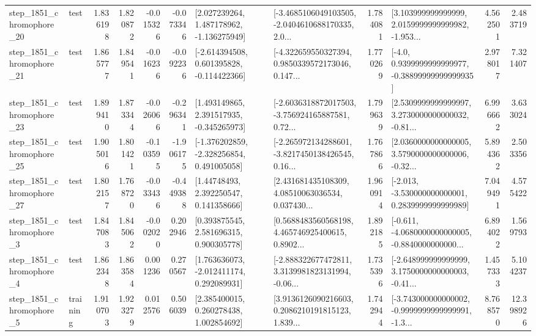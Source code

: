 \begin{tabular}{llrrrrllrlrr}
 step\_1851\_chromophore\_20 &      test &      1.836198 &    1.820872 &     -0.015326 & -0.073346 &    [2.027239264, 1.487178962, -1.136275949] &  [-3.4685106049103505, -2.0404610688170335, 2.0... &       1.784081 &  [3.103999999999999, 2.0159999999999982, -1.953... &            4.562501 &          2.483719 \\
 step\_1851\_chromophore\_21 &      test &      1.865777 &    1.849541 &     -0.016236 & -0.092236 &   [-2.614394508, 0.601395828, -0.114422366] &  [-4.322659550327394, 0.9850339572173046, 0.147... &       1.770269 &   [-4.0, 0.9399999999999977, -0.38899999999999935] &            2.978017 &          7.321407 \\
 step\_1851\_chromophore\_23 &      test &      1.899410 &    1.873344 &     -0.026066 & -0.296341 &    [1.493149865, 2.391517935, -0.345265973] &  [-2.6036318872017503, -3.756924165887581, 0.72... &       1.799639 &  [2.5309999999999997, 3.2730000000000032, -0.81... &            6.996662 &          3.633024 \\
 step\_1851\_chromophore\_25 &      test &      1.905016 &    1.801421 &     -0.103595 & -1.906175 &   [-1.376202859, -2.328256854, 0.491005058] &  [-2.265972134288601, -3.8217450138426545, 0.16... &       1.767866 &  [2.0360000000000005, 3.5790000000000006, -0.32... &            5.894362 &          2.503356 \\
 step\_1851\_chromophore\_27 &      test &      1.802157 &    1.768720 &     -0.033436 & -0.449388 &      [1.44748493, 2.392250547, 0.141358666] &  [2.431681435108309, 4.08510063036534, 0.037430... &       1.960914 &   [-2.013, -3.530000000000001, 0.2839999999999989] &            7.049491 &          4.575422 \\
  step\_1851\_chromophore\_3 &      test &      1.847083 &    1.845062 &     -0.002020 &  0.202946 &     [0.393875545, 2.581696315, 0.900305778] &  [0.5688483560568198, 4.465746925400615, 0.8902... &       1.892185 &  [-0.611, -4.0680000000000005, -0.8840000000000... &            6.894022 &          1.569793 \\
  step\_1851\_chromophore\_4 &      test &      1.862348 &    1.863584 &      0.001236 &  0.270567 &    [1.763636073, -2.012411174, 0.292089931] &  [-2.888322677472811, 3.3139981823131994, -0.06... &       1.735396 &  [-2.648999999999999, 3.1750000000000003, -0.41... &            1.457333 &          5.104237 \\
  step\_1851\_chromophore\_5 &  training &      1.910703 &    1.923279 &      0.012576 &  0.506039 &     [2.385400015, 0.260278438, 1.002854692] &  [3.9136126090216603, 0.2086210191815123, 1.839... &       1.742944 &  [-3.743000000000002, -0.9999999999999991, -1.3... &            8.768570 &         12.398926 \\

\end{tabular}

